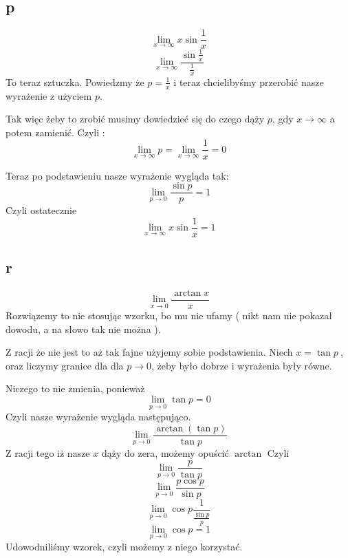 \documentclass{article}
\begin{document}
\newpage
\subsection{p}
$$\lim_{x \to \infty}{x \sin{\frac{1}{x}}} $$
$$\lim_{x \to \infty}{ \frac{\sin{\frac{1}{x}}}{\frac{1}{x}}} $$
To teraz sztuczka. Powiedzmy że $ p = \frac{1}{x} $ i teraz chcielibyśmy przerobić nasze wyrażenie z użyciem $p$.

Tak więc żeby to zrobić musimy dowiedzieć się do czego dąży $p$, gdy $x \to \infty$ a potem zamienić. Czyli :
$$ \lim_{x \to \infty}{p} = \lim_{x \to \infty}{\frac{1}{x}} = 0$$

Teraz po podstawieniu nasze wyrażenie wygląda tak:
$$\lim_{p \to 0}{\frac{\sin{p}}{p}} = 1$$
Czyli ostatecznie 
$$\lim_{x \to \infty}{x \sin{\frac{1}{x}}} = 1 $$

\subsection{r}
$$\lim_{x \to 0}{\frac{\arctan{x}}{x}} $$
Rozwiązemy to nie stosując wzorku, bo mu nie ufamy ( nikt nam nie pokazał dowodu, a na słowo tak nie można ).

Z racji że nie jest to aż tak fajne użyjemy sobie podstawienia. Niech $ x = \tan{p}\ $, oraz liczymy granice dla dla $ p \to 0 $, żeby było dobrze i wyrażenia były równe.

Niczego to nie zmienia, ponieważ
$$ \lim_{p \to 0}{\tan{p}} = 0 $$
Czyli nasze wyrażenie wygląda następująco.
$$\lim_{p \to 0}{\frac{\arctan{(\tan{p})}}{\tan{p}}} $$
Z racji tego iż nasze $x$ dąży do zera, możemy opuścić $\arctan$
Czyli
$$\lim_{p \to 0}{\frac{p}{\tan{p}}} $$
$$\lim_{p \to 0}{\frac{p\cos{p}}{\sin{p}}} $$
$$\lim_{p \to 0}{\cos{p}\frac{1}{\frac{\sin{p}}{p}}} $$
$$\lim_{p \to 0}{\cos{p}} = 1 $$
Udowodniliśmy wzorek, czyli możemy z niego korzystać.

 
\end{document}
